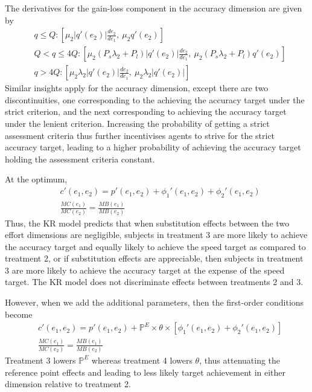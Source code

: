 \documentclass[12pt, letterpaper, DIV=11, numbers=noendperiod]{article}
\begin{document}
The derivatives for the gain-loss component in the accuracy dimension are given by
\[
\begin{aligned}
& q \leq Q: [\mu_2 |q'(e_2)| \frac {de_2}{de_1}, \: \mu_2 q'(e_2)] \nonumber \\
& Q < q \leq 4Q: [\mu_2 (P_s \lambda_2 + P_l) |q'(e_2)| \frac {de_2}{de_1}, \: \mu_2 (P_s \lambda_2 + P_l) q'(e_2)] \nonumber \\
& q > 4Q: [\mu_2 \lambda_2 |q'(e_2)| \frac {de_2}{de_1}, \: \mu_2 \lambda_2 |q'(e_2)|] \nonumber
\end{aligned}
\]
Similar insights apply for the accuracy dimension, except there are two discontinuities, one corresponding to the achieving the accuracy target under the strict criterion, and the next corresponding to achieving the accuracy target under the lenient criterion. Increasing the probability of getting a strict assessment criteria thus further incentivises agents to strive for the strict accuracy target, leading to a higher probability of achieving the accuracy target holding the assessment criteria constant.

At the optimum,
\[
\begin{aligned}
& c'(e_1, e_2) = p'(e_1, e_2) + \phi_1'(e_1, e_2) + \phi_2'(e_1, e_2) \nonumber \\
& \frac {MC(e_1)}{MC(e_2)} = \frac {MB(e_1)}{MB(e_2)} \nonumber
\end{aligned}
\]
Thus, the KR model predicts that when substitution effects between the two effort dimensions are negligible, subjects in treatment 3 are more likely to achieve the accuracy target and equally likely to achieve the speed target as compared to treatment 2, or if substitution effects are appreciable, then subjects in treatment 3 are more likely to achieve the accuracy target at the expense of the speed target. The KR model does not discriminate effects between treatments 2 and 3.

However, when we add the additional parameters, then the first-order conditions become
\[
\begin{aligned}
& c'(e_1, e_2) = p'(e_1, e_2) + \mathbb{P}^E \times \theta \times [\phi_1'(e_1, e_2) + \phi_2'(e_1, e_2)] \nonumber \\
& \frac {MC(e_1)}{MC(e_2)} = \frac {MB(e_1)}{MB(e_2)} \nonumber
\end{aligned}
\]
Treatment 3 lowers \(\mathbb{P}^E\) whereas treatment 4 lowers \(\theta\), thus attenuating the reference point effects and leading to less likely target achievement in either dimension relative to treatment 2.
\end{document}
